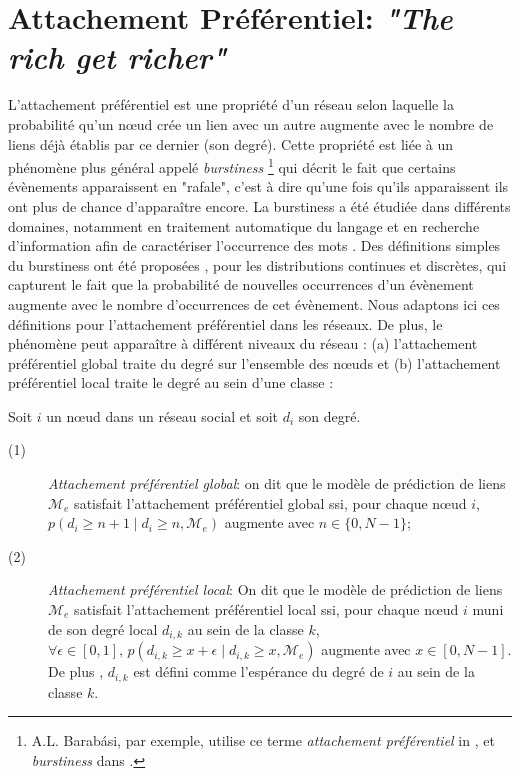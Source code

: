 \documentclass[french]{hermes-journal}
\newcommand{\pr}{p}
\begin{document}
\section{Attachement Préférentiel: \emph{"The rich get richer"}}
\label{sec:burstiness}


L'attachement préférentiel est une propriété d'un réseau selon laquelle la probabilité qu'un n\oe{}ud crée un lien avec un autre augmente avec le nombre de liens déjà établis par ce dernier (son degré). Cette propriété est liée à un phénomène plus général appelé \textit{burstiness} \footnote{A.L. Barab\'asi, par exemple, utilise ce terme \textit{attachement préférentiel} in \cite{barabasi1999emergence}, et \textit{burstiness} dans \cite{barabasi_burst}.} qui décrit le fait que certains évènements apparaissent en "rafale", c'est à dire qu'une fois qu'ils apparaissent ils ont plus de chance d'apparaître encore. La burstiness a été étudiée dans différents domaines, notamment en traitement automatique du langage et en recherche d'information afin de caractériser l'occurrence des mots \cite{church1995poisson}. Des définitions simples du burstiness ont été proposées \cite{clinchant2008bnb,clinchant2010information}, pour les distributions continues et discrètes, qui capturent le fait que la probabilité de nouvelles occurrences d'un évènement augmente avec le nombre d'occurrences de cet évènement. Nous adaptons ici ces définitions pour l'attachement préférentiel dans les réseaux. De plus, le phénomène peut apparaître à différent niveaux du réseau : (a) l'attachement préférentiel global traite du degré sur l'ensemble des n\oe{}uds et (b) l'attachement préférentiel local traite le degré au sein d'une classe :


\begin{definition}
Soit $i$ un n\oe{}ud dans un réseau social et soit $d_i$ son degré.
\begin{description}
    \item[(1)] \emph{Attachement préférentiel global}: on dit que le modèle de prédiction de liens $\mathcal{M}_e$ satisfait l'attachement préférentiel global ssi, pour chaque n\oe{}ud $i$, $\pr(d_i \ge n+1 \mid d_i \ge n, \mathcal{M}_e)$ augmente avec $n \in \{0, N-1\}$;
 \item[(2)] \emph{Attachement préférentiel local}: On dit que le modèle de prédiction de liens  $\mathcal{M}_e$ satisfait l'attachement préférentiel local ssi, pour chaque n\oe{}ud $i$ muni de son degré local $d_{i,k}$  au sein de la classe $k$, $\forall \epsilon \in [0,1], \, \pr(d_{i,k} \ge x+\epsilon \mid d_{i,k} \ge x, \mathcal{M}_e)$  augmente avec $x \in [0,N-1]$. De plus , $d_{i,k}$ est défini comme l'espérance du degré de $i$ au sein de la classe $k$.
\end{description}
\label{def:burst-soc-net}
\end{definition}
\end{document}
